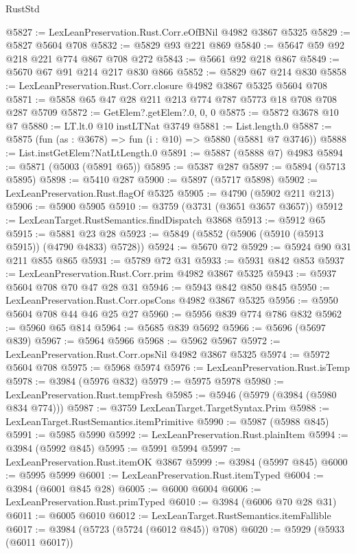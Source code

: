 \begin{lexlean}{RustStd}
\begin{coremodule}
@5827 := LexLeanPreservation.Rust.Corr.eOfBNil @4982 @3867 @5325
@5829 := @5827 @5604 @708
@5832 := @5829 @93 @221 @869
@5840 := @5647 @59 @92 @218 @221 @774 @867 @708 @272
@5843 := @5661 @92 @218 @867
@5849 := @5670 @67 @91 @214 @217 @830 @866
@5852 := @5829 @67 @214 @830
@5858 := LexLeanPreservation.Rust.Corr.closure @4982 @3867 @5325 @5604 @708
@5871 := @5858 @65 @47 @28 @211 @213 @774 @787 @5773 @18 @708 @708 @287 @5709
@5872 := GetElem?.getElem?.{0, 0, 0}
@5875 := @5872 @3678 @10 @7
@5880 := LT.lt.{0} @10 instLTNat @3749
@5881 := List.length.{0}
@5887 := @5875 (fun (as : @3678) => fun (i : @10) => @5880 (@5881 @7 @3746))
@5888 := List.instGetElem?NatLtLength.{0}
@5891 := @5887 (@5888 @7) @4983
@5894 := @5871 (@5003 (@5891 @65))
@5895 := @5387 @287
@5897 := @5894 (@5713 @5895)
@5898 := @5410 @287
@5900 := @5897 (@5717 @5898)
@5902 := LexLeanPreservation.Rust.flagOf @5325
@5905 := @4790 (@5902 @211 @213)
@5906 := @5900 @5905
@5910 := @3759 (@3731 (@3651 @3657 @3657))
@5912 := LexLeanTarget.RustSemantics.findDispatch @3868
@5913 := @5912 @65
@5915 := @5881 @23 @28
@5923 := @5849 (@5852 (@5906 (@5910 (@5913 @5915)) (@4790 @4833) @5728))
@5924 := @5670 @72
@5929 := @5924 @90 @31 @211 @855 @865
@5931 := @5789 @72 @31
@5933 := @5931 @842 @853
@5937 := LexLeanPreservation.Rust.Corr.prim @4982 @3867 @5325
@5943 := @5937 @5604 @708 @70 @47 @28 @31
@5946 := @5943 @842 @850 @845
@5950 := LexLeanPreservation.Rust.Corr.opsCons @4982 @3867 @5325
@5956 := @5950 @5604 @708 @44 @46 @25 @27
@5960 := @5956 @839 @774 @786 @832
@5962 := @5960 @65 @814
@5964 := @5685 @839 @5692
@5966 := @5696 (@5697 @839)
@5967 := @5964 @5966
@5968 := @5962 @5967
@5972 := LexLeanPreservation.Rust.Corr.opsNil @4982 @3867 @5325
@5974 := @5972 @5604 @708
@5975 := @5968 @5974
@5976 := LexLeanPreservation.Rust.isTemp
@5978 := @3984 (@5976 @832)
@5979 := @5975 @5978
@5980 := LexLeanPreservation.Rust.tempFresh
@5985 := @5946 (@5979 (@3984 (@5980 @834 @774)))
@5987 := @3759 LexLeanTarget.TargetSyntax.Prim
@5988 := LexLeanTarget.RustSemantics.itemPrimitive
@5990 := @5987 (@5988 @845)
@5991 := @5985 @5990
@5992 := LexLeanPreservation.Rust.plainItem
@5994 := @3984 (@5992 @845)
@5995 := @5991 @5994
@5997 := LexLeanPreservation.Rust.itemOK @3867
@5999 := @3984 (@5997 @845)
@6000 := @5995 @5999
@6001 := LexLeanPreservation.Rust.itemTyped
@6004 := @3984 (@6001 @845 @28)
@6005 := @6000 @6004
@6006 := LexLeanPreservation.Rust.primTyped
@6010 := @3984 (@6006 @70 @28 @31)
@6011 := @6005 @6010
@6012 := LexLeanTarget.RustSemantics.itemFallible
@6017 := @3984 (@5723 (@5724 (@6012 @845)) @708)
@6020 := @5929 (@5933 (@6011 @6017))

\end{coremodule}
\end{lexlean}
